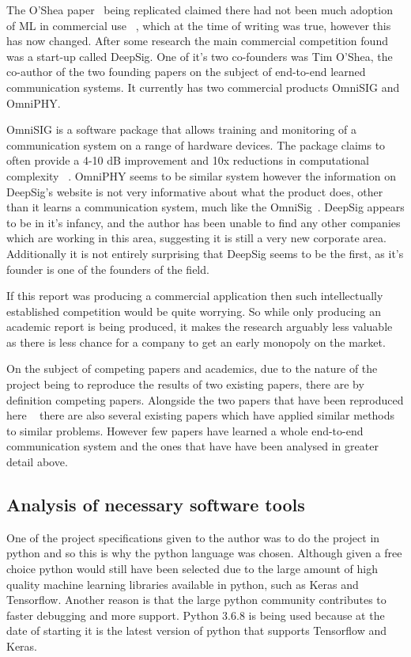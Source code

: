 \documentclass[12pt,onecolumn,letterpaper]{article}
\begin{document}
The O'Shea paper~\cite{oShea} being replicated claimed there had not been much adoption of ML in commercial use ~\cite{oShea}, which at the time of writing was true, however this has now changed. After some research the main commercial competition found was a start-up called DeepSig. One of it's two co-founders was Tim O'Shea, the co-author of the two founding papers on the subject of end-to-end learned communication systems. It currently has two commercial products OmniSIG and OmniPHY.

OmniSIG is a software package that allows training and monitoring of a communication system on a range of hardware devices. The package claims to often provide a 4-10 dB improvement and 10x reductions in computational complexity ~\cite{DeepsigOmnisig}. OmniPHY seems to be similar system however the information on DeepSig's website is not very informative about what the product does, other than it learns a communication system, much like the OmniSig~\cite{DeepsigOmniphy}. DeepSig appears to be in it's infancy, and the author has been unable to find any other companies which are working in this area, suggesting it is still a very new corporate area. Additionally it is not entirely surprising that DeepSig seems to be the first, as it's founder is one of the founders of the field. 

If this report was producing a commercial application then such intellectually established competition would be quite worrying. So while only producing an academic report is being produced, it makes the research arguably less valuable as there is less chance for a company to get an early monopoly on the market. 

On the subject of competing papers and academics, due to the nature of the project being to reproduce the results of two existing papers, there are by definition competing papers. Alongside the two papers that have been reproduced here ~\cite{oShea,Aoudia} there are also several existing papers which have applied similar methods to similar problems. However few papers have learned a whole end-to-end communication system and the ones that have have been analysed in greater detail above.

\subsection{Analysis of necessary software tools}

One of the project specifications given to the author was to do the project in python and so this is why the python language was chosen. Although given a free choice python would still have been selected due to the large amount of high quality machine learning libraries available in python, such as Keras and Tensorflow. Another reason is that the large python community contributes to faster debugging and more support. Python 3.6.8 is being used because at the date of starting it is the latest version of python that supports Tensorflow and Keras. 
\end{document}
